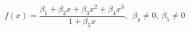 

\[
f(x) = \frac{\beta_1 + \beta_2x + \beta_3x^2 + \beta_4x^3}{1 + \beta_5x}, \ \ \beta_4 \neq 0, \ \beta_5 \neq 0
\]


